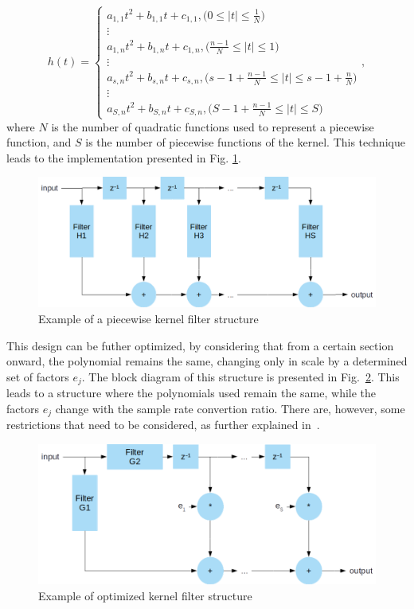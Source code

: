 \begin{equation}
	h(t) = 
	\begin{cases}
		a_{1,1}t^2+b_{1,1}t + c_{1,1}, \bigg(0 \leq |t| \leq \frac{1}{N}\bigg)\\
		\vdots \\
		a_{1,n}t^2+b_{1,n}t + c_{1,n}, \bigg(\frac{n-1}{N} \leq |t| \leq 1\bigg)\\
		\vdots \\
		a_{s,n}t^2+b_{s,n}t + c_{s,n}, \bigg(s-1+\frac{n-1}{N} \leq |t| \leq s-1+\frac{n}{N}\bigg)\\
		\vdots \\
		a_{S,n}t^2+b_{S,n}t + c_{S,n}, \bigg(S-1+\frac{n-1}{N} \leq |t| \leq S\bigg)
	\end{cases}
,
	\label{eq:kernel}
\end{equation}
where $N$ is the number of quadratic functions used to represent a piecewise
function, and $S$ is the number of piecewise functions of the kernel. This
technique leads to the implementation presented in Fig. \ref{fig:kernel}.

\begin{figure}[!htb]
  \centering
  \includegraphics[width=\textwidth]{Figures/kernel_filter.png}
  \caption{Example of a piecewise kernel filter structure}
  \label{fig:kernel}
\end{figure}

This design can be futher optimized, by considering that from a certain section
onward, the polynomial remains the same, changing only in scale by a determined
set of factors $e_j$. The block diagram of this structure is presented in
Fig.~\ref{fig:kernel_block}. This leads to a structure where the polynomials
used remain the same, while the factors $e_j$ change with the sample rate
convertion ratio. There are, however, some restrictions that need to be
considered, as further explained in~\cite{aikawa:kernel}.

\begin{figure}[!htb]
  \centering
  \includegraphics[width=\textwidth]{Figures/kernel_filter_2.png}
  \caption{Example of optimized kernel filter structure}
  \label{fig:kernel_block}
\end{figure}

